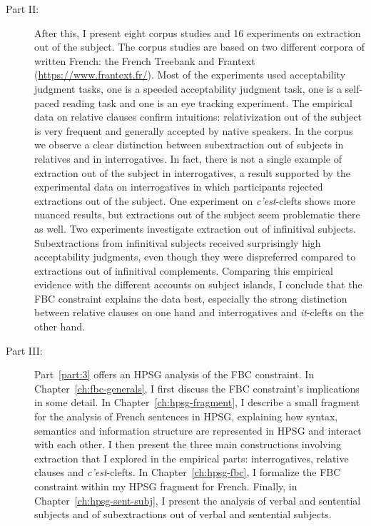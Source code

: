 \begin{description}
\item[Part II:]
After this, I present eight corpus studies and 16 experiments on extraction out of the subject. The corpus studies are based on two different corpora of written French: the French Treebank \citep{Abeille.2003.FTB,Abeille.2019.FTB} and Frantext (\url{https://www.frantext.fr/}). Most of the experiments used acceptability judgment tasks, one is a speeded acceptability judgment task, one is a self-paced reading task and one is an eye tracking experiment. The empirical data on relative clauses confirm  intuitions: relativization out of the subject is very frequent and generally accepted by native speakers. In the corpus we observe a clear distinction between subextraction out of subjects in relatives and in interrogatives. In fact, there is not a single example of extraction out of the subject in interrogatives, a result supported by the experimental data on interrogatives in which participants rejected extractions out of the subject. One experiment on \emph{c'est}-clefts shows more nuanced results, but extractions out of the subject seem problematic there as well. Two experiments investigate extraction out of infinitival subjects. Subextractions from infinitival subjects received surprisingly high acceptability judgments, even though they were dispreferred compared to extractions out of infinitival complements. Comparing this empirical evidence with the different accounts on subject islands, I conclude that the FBC constraint explains the data best, especially the strong distinction between relative clauses on one hand and interrogatives and \emph{it}-clefts on the other hand.

\item[Part III:]
Part~\ref{part:3} offers an HPSG analysis of the FBC constraint. In Chapter~\ref{ch:fbc-generals}, I first discuss the FBC constraint's implications in some detail. In Chapter~\ref{ch:hpsg-fragment}, I describe a small fragment for the analysis of French sentences in HPSG, explaining how syntax, semantics and information structure are represented in HPSG and interact with each other. I then present the three main constructions involving extraction that I explored in the empirical parts: interrogatives, relative clauses and \emph{c'est}-clefts. In Chapter~\ref{ch:hpsg-fbc}, I formalize the FBC constraint within my HPSG fragment for French. Finally, in Chapter~\ref{ch:hpsg-sent-subj}, I present the analysis of verbal and sentential subjects and of subextractions out of verbal and sentential subjects. 


\end{description}
